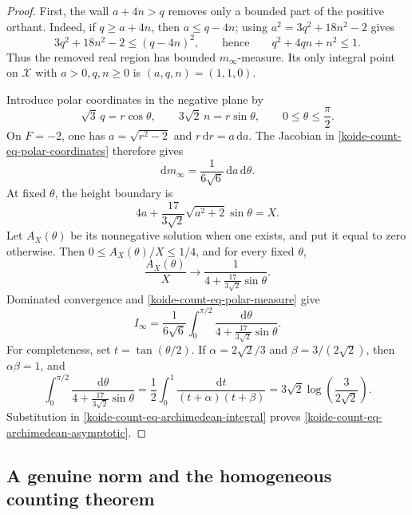\begin{proof}
First, the wall \(a+4n>q\) removes only a bounded part of the positive
orthant.  Indeed, if \(q\geq a+4n\), then \(a\leq q-4n\); using
\(a^2=3q^2+18n^2-2\) gives
\[
 3q^2+18n^2-2\leq(q-4n)^2,
 \qquad\text{hence}\qquad
 q^2+4qn+n^2\leq1.
\]
Thus the removed real region has bounded \(m_\infty\)-measure.  Its only
integral point on \(\mathscr X\) with \(a>0,q,n\geq0\) is
\((a,q,n)=(1,1,0)\).

Introduce polar coordinates in the negative plane by
\begin{equation}
 \sqrt3\,q=r\cos\theta,
 \qquad
 3\sqrt2\,n=r\sin\theta,
 \qquad
 0\leq\theta\leq\frac\pi2.
 \label{koide-count-eq-polar-coordinates}
\end{equation}
On \(F=-2\), one has \(a=\sqrt{r^2-2}\) and \(r\,\mathrm dr=a\,\mathrm da\).
The Jacobian in \eqref{koide-count-eq-polar-coordinates} therefore gives
\begin{equation}
 \mathrm dm_\infty
 =\frac1{6\sqrt6}\,\mathrm da\,\mathrm d\theta.
 \label{koide-count-eq-polar-measure}
\end{equation}
At fixed \(\theta\), the height boundary is
\begin{equation}
 4a+\frac{17}{3\sqrt2}\sqrt{a^2+2}\sin\theta=X.
 \label{koide-count-eq-height-boundary}
\end{equation}
Let \(A_X(\theta)\) be its nonnegative solution when one exists, and put
it equal to zero otherwise.  Then \(0\leq A_X(\theta)/X\leq1/4\), and
for every fixed \(\theta\),
\[
 \frac{A_X(\theta)}{X}
 \longrightarrow
 \frac1{4+\frac{17}{3\sqrt2}\sin\theta}.
\]
Dominated convergence and \eqref{koide-count-eq-polar-measure} give
\begin{equation}
 I_\infty
 =\frac1{6\sqrt6}\int_0^{\pi/2}
 \frac{\mathrm d\theta}
 {4+\frac{17}{3\sqrt2}\sin\theta}.
 \label{koide-count-eq-archimedean-integral}
\end{equation}
For completeness, set \(t=\tan(\theta/2)\).  If
\(\alpha=2\sqrt2/3\) and \(\beta=3/(2\sqrt2)\), then
\(\alpha\beta=1\), and
\[
 \int_0^{\pi/2}
 \frac{\mathrm d\theta}
 {4+\frac{17}{3\sqrt2}\sin\theta}
 =\frac12\int_0^1\frac{\mathrm dt}{(t+\alpha)(t+\beta)}
 =3\sqrt2\log\!\left(\frac3{2\sqrt2}\right).
\]
Substitution in \eqref{koide-count-eq-archimedean-integral} proves
\eqref{koide-count-eq-archimedean-asymptotic}.
\end{proof}

\subsection{A genuine norm and the homogeneous counting theorem}
\label{koide-count-subsec-gos}

